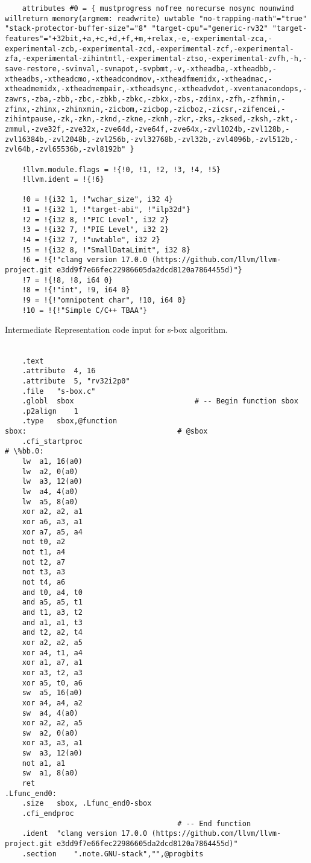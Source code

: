 \begin{lstlisting}
    attributes #0 = { mustprogress nofree norecurse nosync nounwind willreturn memory(argmem: readwrite) uwtable "no-trapping-math"="true" "stack-protector-buffer-size"="8" "target-cpu"="generic-rv32" "target-features"="+32bit,+a,+c,+d,+f,+m,+relax,-e,-experimental-zca,-experimental-zcb,-experimental-zcd,-experimental-zcf,-experimental-zfa,-experimental-zihintntl,-experimental-ztso,-experimental-zvfh,-h,-save-restore,-svinval,-svnapot,-svpbmt,-v,-xtheadba,-xtheadbb,-xtheadbs,-xtheadcmo,-xtheadcondmov,-xtheadfmemidx,-xtheadmac,-xtheadmemidx,-xtheadmempair,-xtheadsync,-xtheadvdot,-xventanacondops,-zawrs,-zba,-zbb,-zbc,-zbkb,-zbkc,-zbkx,-zbs,-zdinx,-zfh,-zfhmin,-zfinx,-zhinx,-zhinxmin,-zicbom,-zicbop,-zicboz,-zicsr,-zifencei,-zihintpause,-zk,-zkn,-zknd,-zkne,-zknh,-zkr,-zks,-zksed,-zksh,-zkt,-zmmul,-zve32f,-zve32x,-zve64d,-zve64f,-zve64x,-zvl1024b,-zvl128b,-zvl16384b,-zvl2048b,-zvl256b,-zvl32768b,-zvl32b,-zvl4096b,-zvl512b,-zvl64b,-zvl65536b,-zvl8192b" }
    
    !llvm.module.flags = !{!0, !1, !2, !3, !4, !5}
    !llvm.ident = !{!6}
    
    !0 = !{i32 1, !"wchar_size", i32 4}
    !1 = !{i32 1, !"target-abi", !"ilp32d"}
    !2 = !{i32 8, !"PIC Level", i32 2}
    !3 = !{i32 7, !"PIE Level", i32 2}
    !4 = !{i32 7, !"uwtable", i32 2}
    !5 = !{i32 8, !"SmallDataLimit", i32 8}
    !6 = !{!"clang version 17.0.0 (https://github.com/llvm/llvm-project.git e3dd9f7e66fec22986605da2dcd8120a7864455d)"}
    !7 = !{!8, !8, i64 0}
    !8 = !{!"int", !9, i64 0}
    !9 = !{!"omnipotent char", !10, i64 0}
    !10 = !{!"Simple C/C++ TBAA"}
\end{lstlisting}

Intermediate Representation code input for s-box algorithm.
\\\\
\begin{lstlisting}
    .text
	.attribute	4, 16
	.attribute	5, "rv32i2p0"
	.file	"s-box.c"
	.globl	sbox                            # -- Begin function sbox
	.p2align	1
	.type	sbox,@function
sbox:                                   # @sbox
	.cfi_startproc
# \%bb.0:
	lw	a1, 16(a0)
	lw	a2, 0(a0)
	lw	a3, 12(a0)
	lw	a4, 4(a0)
	lw	a5, 8(a0)
	xor	a2, a2, a1
	xor	a6, a3, a1
	xor	a7, a5, a4
	not	t0, a2
	not	t1, a4
	not	t2, a7
	not	t3, a3
	not	t4, a6
	and	t0, a4, t0
	and	a5, a5, t1
	and	t1, a3, t2
	and	a1, a1, t3
	and	t2, a2, t4
	xor	a2, a2, a5
	xor	a4, t1, a4
	xor	a1, a7, a1
	xor	a3, t2, a3
	xor	a5, t0, a6
	sw	a5, 16(a0)
	xor	a4, a4, a2
	sw	a4, 4(a0)
	xor	a2, a2, a5
	sw	a2, 0(a0)
	xor	a3, a3, a1
	sw	a3, 12(a0)
	not	a1, a1
	sw	a1, 8(a0)
	ret
.Lfunc_end0:
	.size	sbox, .Lfunc_end0-sbox
	.cfi_endproc
                                        # -- End function
	.ident	"clang version 17.0.0 (https://github.com/llvm/llvm-project.git e3dd9f7e66fec22986605da2dcd8120a7864455d)"
	.section	".note.GNU-stack","",@progbits

\end{lstlisting}


